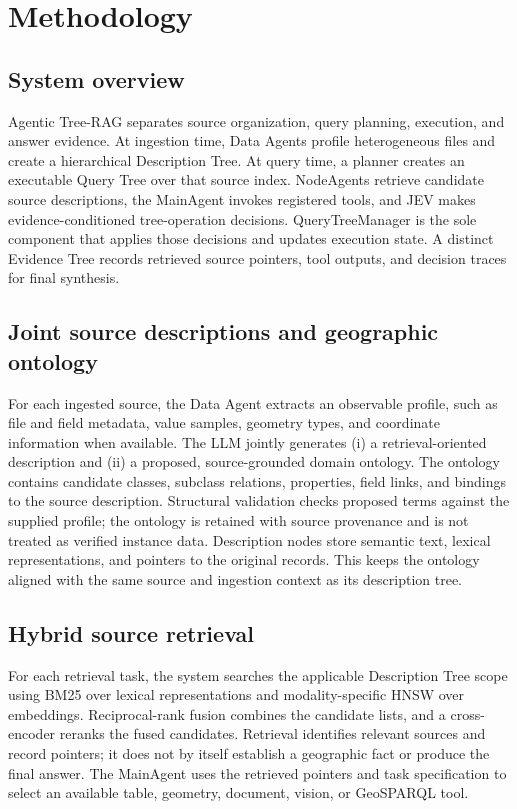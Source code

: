 \section{Methodology}\label{sec:method}

\subsection{System overview}
Agentic Tree-RAG separates source organization, query planning, execution, and answer evidence. At ingestion time, Data Agents profile heterogeneous files and create a hierarchical Description Tree. At query time, a planner creates an executable Query Tree over that source index. NodeAgents retrieve candidate source descriptions, the MainAgent invokes registered tools, and JEV makes evidence-conditioned tree-operation decisions. QueryTreeManager is the sole component that applies those decisions and updates execution state. A distinct Evidence Tree records retrieved source pointers, tool outputs, and decision traces for final synthesis.

\subsection{Joint source descriptions and geographic ontology}
For each ingested source, the Data Agent extracts an observable profile, such as file and field metadata, value samples, geometry types, and coordinate information when available. The LLM jointly generates (i) a retrieval-oriented description and (ii) a proposed, source-grounded domain ontology. The ontology contains candidate classes, subclass relations, properties, field links, and bindings to the source description. Structural validation checks proposed terms against the supplied profile; the ontology is retained with source provenance and is not treated as verified instance data. Description nodes store semantic text, lexical representations, and pointers to the original records. This keeps the ontology aligned with the same source and ingestion context as its description tree.

\subsection{Hybrid source retrieval}
For each retrieval task, the system searches the applicable Description Tree scope using BM25 over lexical representations and modality-specific HNSW over embeddings. Reciprocal-rank fusion combines the candidate lists, and a cross-encoder reranks the fused candidates. Retrieval identifies relevant sources and record pointers; it does not by itself establish a geographic fact or produce the final answer. The MainAgent uses the retrieved pointers and task specification to select an available table, geometry, document, vision, or GeoSPARQL tool.

